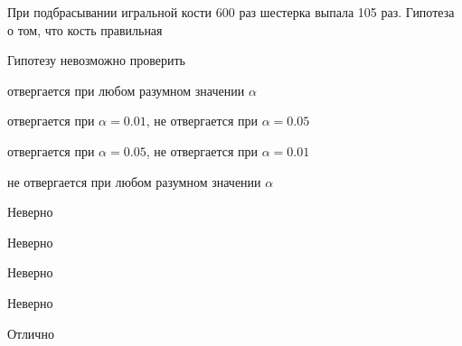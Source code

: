
\begin{question}
При подбрасывании игральной кости 600 раз шестерка выпала 105 раз.
Гипотеза о том, что кость правильная
\begin{answerlist}
  \item Гипотезу невозможно проверить
  \item отвергается при любом разумном значении \(\alpha\)
  \item отвергается при \(\alpha = 0.01\), не отвергается при \(\alpha = 0.05\)
  \item отвергается при \(\alpha = 0.05\), не отвергается при \(\alpha = 0.01\)
  \item не отвергается при любом разумном значении \(\alpha\)
\end{answerlist}
\end{question}

\begin{solution}
\begin{answerlist}
  \item Неверно
  \item Неверно
  \item Неверно
  \item Неверно
  \item Отлично
\end{answerlist}
\end{solution}

